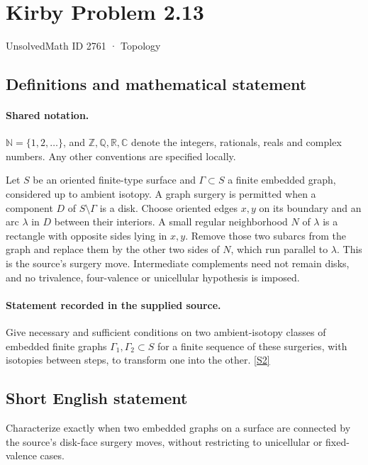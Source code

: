 \documentclass[11pt]{article}
\newcommand{\sref}[2]{\hyperlink{source:#1:#2}{[S#2]}}
\begin{document}
\setcounter{section}{2760}
\section{Kirby Problem 2.13}\label{2761}
{\small\sffamily UnsolvedMath ID 2761 · Topology}
\subsection{Definitions and mathematical statement}

\paragraph{Shared notation.}$\mathbb N=\{1,2,\ldots\}$, and $\mathbb Z,\mathbb Q,\mathbb R,\mathbb C$ denote the integers, rationals, reals and complex numbers. Any other conventions are specified locally.


Let $S$ be an oriented finite-type surface and $\Gamma\subset S$ a finite embedded graph, considered up to ambient isotopy. A graph surgery is permitted when a component $D$ of $S\setminus\Gamma$ is a disk. Choose oriented edges $x,y$ on its boundary and an arc $\lambda$ in $D$ between their interiors. A small regular neighborhood $N$ of $\lambda$ is a rectangle with opposite sides lying in $x,y$. Remove those two subarcs from the graph and replace them by the other two sides of $N$, which run parallel to $\lambda$. This is the source's surgery move. Intermediate complements need not remain disks, and no trivalence, four-valence or unicellular hypothesis is imposed.
\paragraph{Statement recorded in the supplied source.}
Give necessary and sufficient conditions on two ambient-isotopy classes of embedded finite graphs $\Gamma_1,\Gamma_2\subset S$ for a finite sequence of these surgeries, with isotopies between steps, to transform one into the other. \sref{2761}{2}

\subsection{Short English statement}
Characterize exactly when two embedded graphs on a surface are connected by the source’s disk-face surgery moves, without restricting to unicellular or fixed-valence cases.
\end{document}
